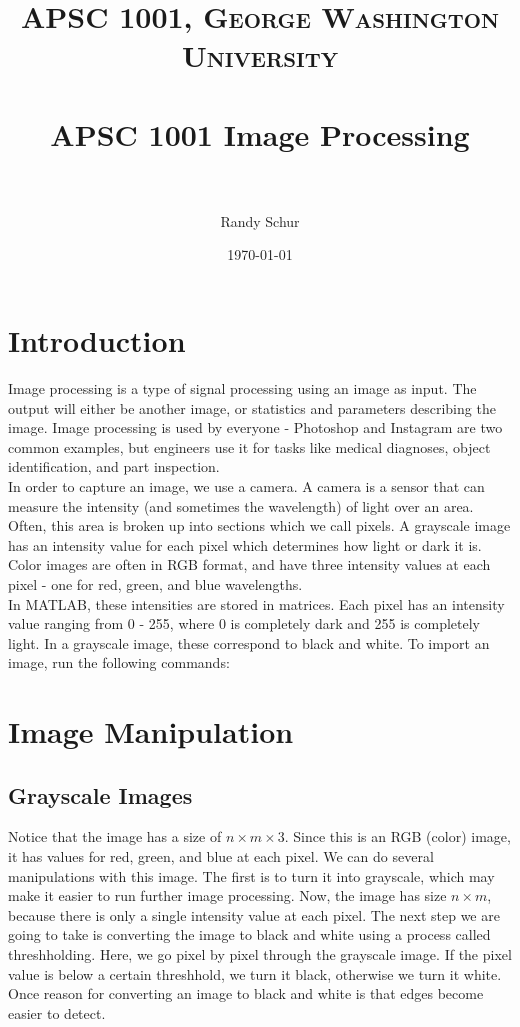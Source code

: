 \documentclass[paper=a4, fontsize=11pt]{scrartcl} %
\title{	
\normalfont \normalsize 
\textsc{APSC 1001, George Washington University} \\ [25pt] %
\horrule{0.5pt} \\[0.4cm] %
\huge APSC 1001 Image Processing\\ %
\horrule{2pt} \\[0.5cm] %
}
\author{\normalsize Randy Schur } %
\date{\normalsize \today } %
\numberwithin{equation}{section} %
\numberwithin{figure}{section} %
\numberwithin{table}{section} %
\begin{document}
\maketitle %

\section{Introduction}
Image processing is a type of signal processing using an image as input. The output will either be another image, or statistics and parameters describing the image. Image processing is used by everyone - Photoshop and Instagram are two common examples, but engineers use it for tasks like medical diagnoses, object identification, and part inspection.\\

In order to capture an image, we use a camera. A camera is a sensor that can measure the intensity (and sometimes the wavelength) of light over an area. Often, this area is broken up into sections which we call pixels. A grayscale image has an intensity value for each pixel which determines how light or dark it is. Color images are often in RGB format, and have three intensity values at each pixel - one for red, green, and blue wavelengths.\\

In MATLAB, these intensities are stored in matrices. Each pixel has an intensity value ranging from 0 - 255, where 0 is completely dark and 255 is completely light. In a grayscale image, these correspond to black and white. To import an image, run the following commands: 


\section{Image Manipulation}
\subsection{Grayscale Images}
Notice that the image has a size of $n\times m\times 3$. Since this is an RGB (color) image, it has values for red, green, and blue at each pixel. We can do several manipulations with this image. The first is to turn it into grayscale, which may make it easier to run further image processing. Now, the image has size $n\times m$, because there is only a single intensity value at each pixel. The next step we are going to take is converting the image to black and white using a process called threshholding. Here, we go pixel by pixel through the grayscale image. If the pixel value is below a certain threshhold, we turn it black, otherwise we turn it white. Once reason for converting an image to black and white is that edges become easier to detect. 

\end{document}
